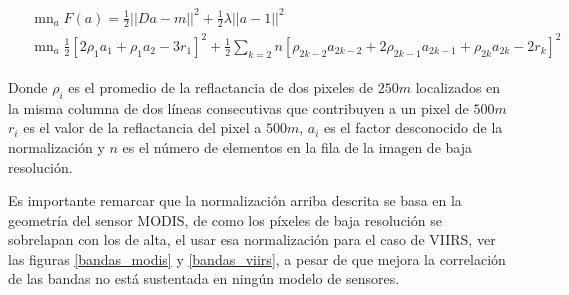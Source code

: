 \small
\begin{eqnarray}
\begin{aligned}
& \mathop{m\acute{i}n}_{a} F(a) = \frac{1}{2}||Da - m||^{2} + \frac{1}{2}\lambda ||a-1||^{2} \nonumber \\ 
& \mathop{m\acute{i}n}_{a} \frac{1}{2}[2\rho_{1}a_{1} + \rho_{1}a_{2} - 3r_{1}]^{2} + \frac{1}{2}\sum_{k=2}{n}[\rho_{2k-2}a_{2k-2}+2\rho_{2k-1}a_{2k-1}+\rho_{2k}a_{2k}-2r_{k}]^{2} \nonumber 
\end{aligned}
\end{eqnarray} 
\normalsize

Donde $\rho_{i}$ es el promedio de la reflactancia de dos pixeles de $250m$ localizados en la misma columna de dos líneas consecutivas que contribuyen a un pixel de $500m$ $r_{i}$ es el valor de la reflactancia del pixel a $500m$, $a_{i}$ es el factor desconocido de la normalización y $n$ es el número de elementos en la fila de la imagen de baja resolución. 

Es importante remarcar que la normalización arriba descrita se basa en la geometría del sensor MODIS, de como los píxeles de baja resolución se sobrelapan con los de alta, el usar esa normalización para el caso de VIIRS, ver las figuras \ref{bandas_modis} y \ref{bandas_viirs}, a pesar de que mejora la correlación de las bandas no está sustentada en ningún modelo de sensores.  
